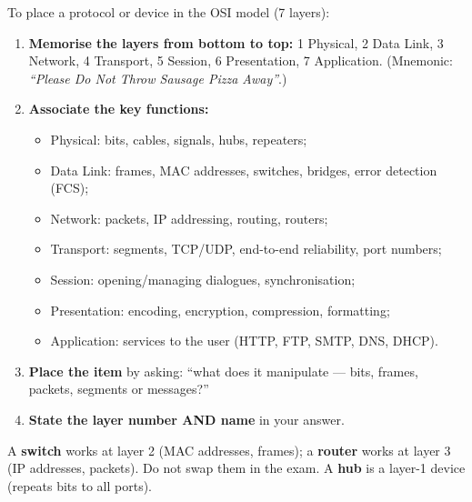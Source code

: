\documentclass[11pt]{article}
\newcommand{\cle}[1]{{\popxbold\color{popdark}#1}}
\begin{document}
\begin{methode}
To place a protocol or device in the \cle{OSI model} (7 layers):
\begin{enumerate}
\item \textbf{Memorise the layers from bottom to top:} 1 Physical, 2 Data Link, 3 Network, 4 Transport, 5 Session, 6 Presentation, 7 Application. (Mnemonic: \emph{``Please Do Not Throw Sausage Pizza Away''}.)
\item \textbf{Associate the key functions:}
\begin{itemize}
\item Physical: bits, cables, signals, hubs, repeaters;
\item Data Link: frames, MAC addresses, switches, bridges, error detection (FCS);
\item Network: packets, IP addressing, routing, routers;
\item Transport: segments, TCP/UDP, end-to-end reliability, port numbers;
\item Session: opening/managing dialogues, synchronisation;
\item Presentation: encoding, encryption, compression, formatting;
\item Application: services to the user (HTTP, FTP, SMTP, DNS, DHCP).
\end{itemize}
\item \textbf{Place the item} by asking: ``what does it manipulate — bits, frames, packets, segments or messages?''
\item \textbf{State the layer number AND name} in your answer.
\end{enumerate}
\end{methode}

\begin{attention}
A \textbf{switch} works at layer 2 (MAC addresses, frames); a \textbf{router} works at layer 3 (IP addresses, packets). Do not swap them in the exam. A \textbf{hub} is a layer-1 device (repeats bits to all ports).
\end{attention}
\end{document}
